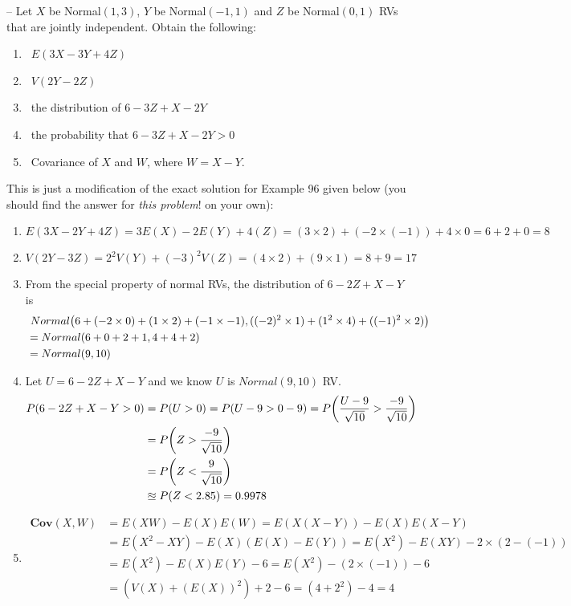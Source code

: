 \documentclass[11pt,paper=a4,abstract=on,parskip=half,DIV=calc,compact]{scrartcl}
\let\originalleft\left
\let\originalright\right
\renewcommand{\left}{\mathopen{}\mathclose\bgroup\originalleft}
\renewcommand{\right}{\aftergroup\egroup\originalright}
\begin{document}
\begin{ExerciseList}
 --
Let $X$ be Normal$(1,3)$, $Y$ be Normal$(-1,1)$ and $Z$ be Normal$(0,1)$ RVs that are jointly independent.
Obtain the following:
\begin{enumerate}
\item~$E(3X-3Y+4Z)$
\item~$V(2Y-2Z)$
\item~the distribution of $6-3Z+X-2Y$
\item~the probability that $6-3Z+X-2Y>0$
\item~Covariance of $X$ and $W$, where $W=X-Y$.
\end{enumerate}

\Answer
This is just a modification of the exact solution for Example 96 given below (you should find the answer for {\em this problem}! on your own):
\begin{enumerate}
\item
\[
E(3X-2Y+4Z) = 3E(X)-2E(Y)+4(Z) = (3 \times 2) + (-2 \times (-1)) + 4 \times 0 = 6 +2 +0 = 8
\]
\item
\[
V(2Y-3Z) = 2^2V(Y) + (-3)^2V(Z) = (4 \times 2) + (9 \times 1) = 8 + 9 = 17 
\]
\item
From the special property of normal RVs, the distribution of $6-2Z+X-Y$ is
\begin{align*}
&~ Normal\left( 6+(-2 \times 0)+(1 \times 2)+(-1 \times -1), ((-2)^2 \times 1) + (1^2 \times 4) + ((-1)^2 \times 2)  \right)\\
&= Normal\left( 6+0+2+1, 4 + 4 +  2  \right)\\
&= Normal(9,10)
\end{align*}
\item
Let $U=6-2Z+X-Y$ and we know $U$ is $Normal(9,10)$ RV.
\begin{align*}
P(6-2Z+X-Y>0)
&= P(U>0) = P(U-9>0-9) = P\left( \frac{U-9}{\sqrt{10}} > \frac{-9}{\sqrt{10}} \right)\\
&= P\left( Z > \frac{-9}{\sqrt{10}} \right)\\
&= P\left( Z < \frac{9}{\sqrt{10}} \right) \\
&\approxeq P(Z < 2.85) = 0.9978
\end{align*}
\item
\begin{align*}
\mathbf{Cov}(X,W)
&= E(XW)-E(X)E(W) = E(X(X-Y))-E(X)E(X-Y)\\
&= E(X^2-XY)-E(X)(E(X)-E(Y)) = E(X^2)-E(XY)-2\times(2-(-1)) \\
&= E(X^2)-E(X)E(Y)-6 = E(X^2)-(2 \times (-1))-6\\
&= (V(X)+(E(X))^2) +2-6 = (4+2^2)-4=4
\end{align*}
\end{enumerate}


\end{ExerciseList}
\end{document}
